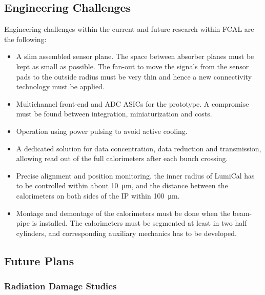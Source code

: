 \subsection{Engineering Challenges}
Engineering challenges within the current and future research within FCAL are the following:
\begin{itemize}
\item{A slim assembled sensor plane. The space between absorber planes must be kept as small
as possible. The fan-out to move the signals from the sensor pads to the outside radius must be very thin and
hence a new connectivity technology must be applied.}
\item{Multichannel front-end and ADC ASICs for the prototype.
A compromise must be found between integration, miniaturization and costs}.
\item{Operation using power pulsing to avoid active cooling}.
\item{A dedicated solution for data concentration, data reduction and transmission, allowing read out of
the full calorimeters after each bunch crossing}.
\item{Precise alignment and position monitoring. the inner radius of LumiCal has to be controlled within about \SI{10}{\micro\meter}, and the distance between the
calorimeters on both sides of the IP within \SI{100}{\micro\meter}}.
\item{Montage and demontage of the calorimeters must be done when the beam-pipe is installed. The calorimeters must be segmented at
least in two half cylinders, and corresponding auxiliary mechanics has to be developed.}
\end{itemize}

\subsection{Future Plans}

\subsubsection{Radiation Damage Studies}

